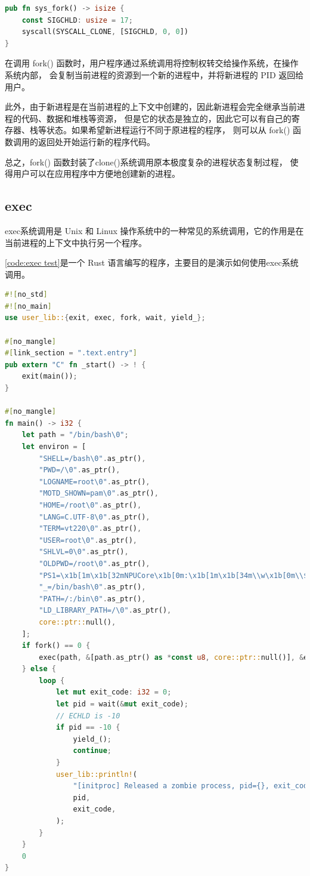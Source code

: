 \begin{lstlisting}[language={Rust}, label={code:sys fork},
    caption={sys fork}]
pub fn sys_fork() -> isize {
    const SIGCHLD: usize = 17;
    syscall(SYSCALL_CLONE, [SIGCHLD, 0, 0])
}
\end{lstlisting}

在调用 fork() 函数时，用户程序通过系统调用将控制权转交给操作系统，在操作系统内部，
会复制当前进程的资源到一个新的进程中，并将新进程的 PID 返回给用户。

此外，由于新进程是在当前进程的上下文中创建的，因此新进程会完全继承当前进程的代码、数据和堆栈等资源，
但是它的状态是独立的，因此它可以有自己的寄存器、栈等状态。如果希望新进程运行不同于原进程的程序，
则可以从 fork() 函数调用的返回处开始运行新的程序代码。

总之，fork() 函数封装了clone()系统调用原本极度复杂的进程状态复制过程，
使得用户可以在应用程序中方便地创建新的进程。

\subsection{exec}

exec系统调用是 Unix 和 Linux 操作系统中的一种常见的系统调用，它的作用是在当前进程的上下文中执行另一个程序。

\autoref{code:exec test}是一个 Rust 语言编写的程序，主要目的是演示如何使用exec系统调用。

\begin{lstlisting}[language={Rust}, label={code:exec test},
    caption={exec test}]
#![no_std]
#![no_main]
use user_lib::{exit, exec, fork, wait, yield_};

#[no_mangle]
#[link_section = ".text.entry"]
pub extern "C" fn _start() -> ! {
    exit(main());
}

#[no_mangle]
fn main() -> i32 {
    let path = "/bin/bash\0";
    let environ = [
        "SHELL=/bash\0".as_ptr(),
        "PWD=/\0".as_ptr(),
        "LOGNAME=root\0".as_ptr(),
        "MOTD_SHOWN=pam\0".as_ptr(),
        "HOME=/root\0".as_ptr(),
        "LANG=C.UTF-8\0".as_ptr(),
        "TERM=vt220\0".as_ptr(),
        "USER=root\0".as_ptr(),
        "SHLVL=0\0".as_ptr(),
        "OLDPWD=/root\0".as_ptr(),
        "PS1=\x1b[1m\x1b[32mNPUCore\x1b[0m:\x1b[1m\x1b[34m\\w\x1b[0m\\$ \0".as_ptr(),
        "_=/bin/bash\0".as_ptr(),
        "PATH=/:/bin\0".as_ptr(),
        "LD_LIBRARY_PATH=/\0".as_ptr(),
        core::ptr::null(),
    ];
    if fork() == 0 {
        exec(path, &[path.as_ptr() as *const u8, core::ptr::null()], &environ);
    } else {
        loop {
            let mut exit_code: i32 = 0;
            let pid = wait(&mut exit_code);
            // ECHLD is -10
            if pid == -10 {
                yield_();
                continue;
            }
            user_lib::println!(
                "[initproc] Released a zombie process, pid={}, exit_code={}",
                pid,
                exit_code,
            );
        }
    }
    0
}
\end{lstlisting}

